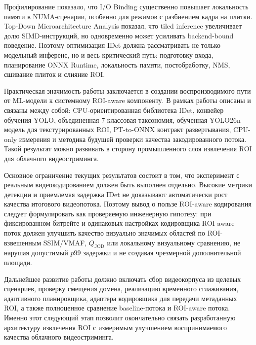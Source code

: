 \documentclass[12pt,a4paper,oneside,openany]{report}
\begin{document}
Профилирование показало, что I/O Binding существенно повышает локальность памяти в NUMA-сценарии, особенно для режимов с разбиением кадра на плитки. Top-Down Microarchitecture Analysis показал, что tiled inference увеличивает долю SIMD-инструкций, но одновременно может усиливать backend-bound поведение. Поэтому оптимизация IDet должна рассматривать не только модельный инференс, но и весь критический путь: подготовку входа, планирование ONNX Runtime, локальность памяти, постобработку, NMS, сшивание плиток и слияние ROI.

Практическая значимость работы заключается в создании воспроизводимого пути от ML-модели к системному ROI-aware компоненту. В рамках работы описаны и связаны между собой: CPU-ориентированная библиотека IDet, конвейер обучения YOLO, объединенная 7-классовая таксономия, обученная YOLO26n-модель для текстурированных ROI, PT-to-ONNX контракт развертывания, CPU-only измерения и методика будущей проверки качества закодированного потока. Такой результат можно развивать в сторону промышленного слоя извлечения ROI для облачного видеостриминга.

Основное ограничение текущих результатов состоит в том, что эксперимент с реальным видеокодированием должен быть выполнен отдельно. Высокие метрики детекции и приемлемая задержка IDet не доказывают автоматически рост качества итогового видеопотока. Поэтому вывод о пользе ROI-aware кодирования следует формулировать как проверяемую инженерную гипотезу: при фиксированном битрейте и одинаковых настройках кодировщика ROI-aware поток должен улучшить качество визуально значимых областей по ROI-взвешенным SSIM/VMAF, $Q_{\operatorname{JOD}}$ или локальному визуальному сравнению, не нарушая допустимый $p99$ задержки и не создавая чрезмерной дополнительной площади.

Дальнейшее развитие работы должно включать сбор видеокорпуса из целевых сценариев, проверку смещения домена, реализацию временного сглаживания, адаптивного планировщика, адаптера кодировщика для передачи метаданных ROI, а также полноценное сравнение baseline-потока и ROI-aware потока. Именно этот следующий этап позволит окончательно связать разработанную архитектуру извлечения ROI с измеримым улучшением воспринимаемого качества облачного видеостриминга.

\clearpage

\end{document}
